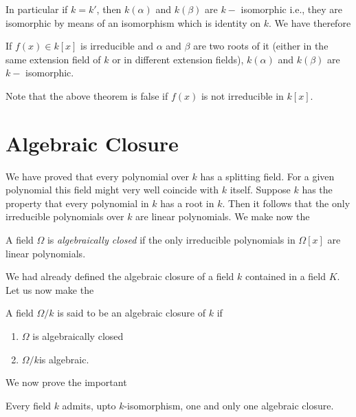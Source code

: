 In particular if $k = k'$, then $k( \alpha )$  and  $ k ( \beta ) $
are $k -$ isomorphic i.e., they are isomorphic by means of an
isomorphism which  is identity on $k$. We have therefore  

\begin{thm}\label{c1:thm4}%
If $ f (x) \in  k [ x ] $ is irreducible and $ \alpha$ and $
  \beta $  are two roots of it (either in the same extension field of
  $ k $ or in different extension fields), $ k ( \alpha ) $ and $ k
  ( \beta ) $ are $k-$ isomorphic.  
\end{thm}

Note that the above theorem is false if $f (x)$ is not
irreducible in $k[x]$. 

\section{Algebraic Closure}\label{c1:s4}%

We have proved  that every polynomial over $k$  has a splitting
field. For a given  polynomial this field might very well coincide
with $k$ itself. Suppose  $k$ has the property that every  polynomial
in $k$ has a root in $k$. Then it follows that  the only irreducible
polynomials over $k$ are linear polynomials. We make now the  

 \begin{defi*}
A field $\Omega$ is  \textit{algebraically closed} if  the only
irreducible  polynomials in $\Omega [ x ]$ are linear polynomials.  
 \end{defi*} 
 
 We had already defined the algebraic closure of a field $k$ contained
 in a field $K$. Let us now make the   

 \begin{defi*}
A field $ \Omega /k $ is said  to be an algebraic closure of $k$ if  
\begin{enumerate}[1)]
\item $ \Omega $ is  algebraically closed 

\item  $ \Omega / k $\pageoriginale is algebraic.
\end{enumerate}
 \end{defi*} 
 
 We now prove the important 

\begin{thm}\label{c1:thm5}%
Every field  $k$ admits, upto $k$-isomorphism, one and only one
  algebraic  closure. 
\end{thm} 

